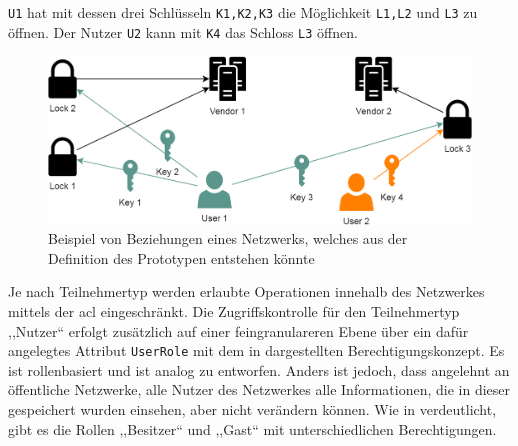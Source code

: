         \colorbox{light-gray}{\lstinline{U1}} hat mit dessen drei Schlüsseln \colorbox{light-gray}{\lstinline{K1,K2,K3}} die Möglichkeit \colorbox{light-gray}{\lstinline{L1,L2}} und \colorbox{light-gray}{\lstinline{L3}} zu öffnen. 
        Der Nutzer \colorbox{light-gray}{\lstinline{U2}} kann mit \colorbox{light-gray}{\lstinline{K4}} das Schloss \colorbox{light-gray}{\lstinline{L3}} öffnen.
        \begin{figure}[H]
    		\centering
    		\includegraphics[width=\textwidth]{graphics/pt_network.png}
    		\caption[Beispiel eines von Beziehungen im Prototypen-Netzwerk]{Beispiel von Beziehungen eines Netzwerks, welches aus der Definition des Prototypen entstehen könnte}
    		\label{fig:pt_network}
    	\end{figure}
        \noindent Je nach Teilnehmertyp werden erlaubte Operationen innehalb des Netzwerkes mittels der \gls{acl} eingeschränkt. 
        Die Zugriffskontrolle für den Teilnehmertyp ,,Nutzer`` erfolgt zusätzlich auf einer feingranulareren Ebene über ein dafür angelegtes Attribut \colorbox{light-gray}{\lstinline{UserRole}} mit dem in  dargestellten Berechtigungskonzept. 
        Es ist rollenbasiert und ist analog zu  entworfen. 
        Anders ist jedoch, dass angelehnt an öffentliche Netzwerke, alle Nutzer des Netzwerkes alle Informationen, die in dieser gespeichert wurden einsehen, aber nicht verändern können. 
        Wie in  verdeutlicht, gibt es die Rollen ,,Besitzer`` und ,,Gast`` mit unterschiedlichen Berechtigungen. 

